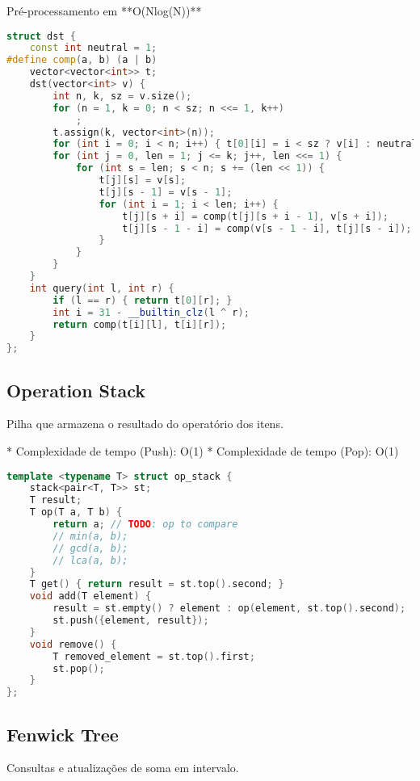 \documentclass[11pt, a4paper, twoside]{article}
\begin{document}
Pré-processamento em **O(Nlog(N))**
\begin{lstlisting}[language=C++]
struct dst {
    const int neutral = 1;
#define comp(a, b) (a | b)
    vector<vector<int>> t;
    dst(vector<int> v) {
        int n, k, sz = v.size();
        for (n = 1, k = 0; n < sz; n <<= 1, k++)
            ;
        t.assign(k, vector<int>(n));
        for (int i = 0; i < n; i++) { t[0][i] = i < sz ? v[i] : neutral; }
        for (int j = 0, len = 1; j <= k; j++, len <<= 1) {
            for (int s = len; s < n; s += (len << 1)) {
                t[j][s] = v[s];
                t[j][s - 1] = v[s - 1];
                for (int i = 1; i < len; i++) {
                    t[j][s + i] = comp(t[j][s + i - 1], v[s + i]);
                    t[j][s - 1 - i] = comp(v[s - 1 - i], t[j][s - i]);
                }
            }
        }
    }
    int query(int l, int r) {
        if (l == r) { return t[0][r]; }
        int i = 31 - __builtin_clz(l ^ r);
        return comp(t[i][l], t[i][r]);
    }
};
\end{lstlisting}

\subsection{Operation Stack}



Pilha que armazena o resultado do operatório dos itens.

* Complexidade de tempo (Push): O(1)
* Complexidade de tempo (Pop): O(1)

\begin{lstlisting}[language=C++]
template <typename T> struct op_stack {
    stack<pair<T, T>> st;
    T result;
    T op(T a, T b) {
        return a; // TODO: op to compare
        // min(a, b);
        // gcd(a, b);
        // lca(a, b);
    }
    T get() { return result = st.top().second; }
    void add(T element) {
        result = st.empty() ? element : op(element, st.top().second);
        st.push({element, result});
    }
    void remove() {
        T removed_element = st.top().first;
        st.pop();
    }
};
\end{lstlisting}


\subsection{Fenwick Tree}



Consultas e atualizações de soma em intervalo.
\end{document}
